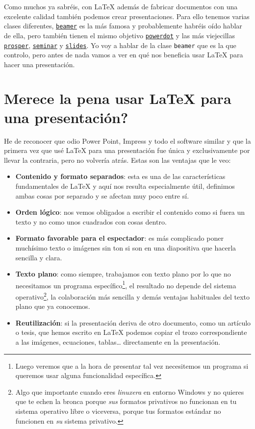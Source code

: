 Como muchos ya sabréis, con LaTeX además de fabricar documentos con una
excelente calidad también podemos crear presentaciones. Para ello
tenemos varias clases diferentes,
\href{https://www.ctan.org/pkg/beamer}{\lstinline!beamer!} es la más
famosa y probablemente habréis oído hablar de ella, pero también tienen
el mismo objetivo
\href{http://www.ctan.org/pkg/powerdot/}{\lstinline!powerdot!} y las más
viejecillas \href{http://www.ctan.org/pkg/prosper}{\lstinline!prosper!},
\href{https://www.ctan.org/pkg/seminar}{\lstinline!seminar!} y
\href{http://www.ctan.org/pkg/slides}{\lstinline!slides!}. Yo voy a
hablar de la clase \lstinline!beamer! que es la que controlo, pero antes
de nada vamos a ver en qué nos beneficia usar LaTeX para hacer una
presentación.

\section{Merece la pena usar LaTeX para una
presentación?}

He de reconocer que odio Power Point, Impress y todo el software similar
y que la primera vez que usé LaTeX para una presentación fue única y
exclusivamente por llevar la contraria, pero no volvería atrás. Estas
son las ventajas que le veo:

\begin{itemize}
\item
  \textbf{Contenido y formato separados}: esta es una de las
  características fundamentales de LaTeX y aquí nos resulta
  especialmente útil, definimos ambas cosas por separado y se afectan
  muy poco entre sí.
\item
  \textbf{Orden lógico}: nos vemos obligados a escribir el contenido
  como si fuera un texto y no como unos cuadrados con cosas dentro.
\item
  \textbf{Formato favorable para el espectador}: es más complicado poner
  muchísimo texto o imágenes sin ton si son en una diapositiva que
  hacerla sencilla y clara.
\item
  \textbf{Texto plano}: como siempre, trabajamos con texto plano por lo
  que no necesitamos un programa específico\footnote{Luego veremos que a
    la hora de presentar tal vez necesitemos un programa si queremos
    usar alguna funcionalidad específica.}, el resultado no depende del
  sistema operativo\footnote{Algo que importante cuando eres
    \emph{linuxera} en entorno Windows y no quieres que te echen la
    bronca porque \emph{sus} formatos privativos no funcionan en tu
    sistema operativo libre o viceversa, porque tus formatos estándar no
    funcionen en \emph{su} sistema privativo.}, la colaboración más
  sencilla y demás ventajas habituales del texto plano que ya conocemos.
\item
  \textbf{Reutilización}: si la presentación deriva de otro documento,
  como un artículo o tesis, que hemos escrito en LaTeX podemos copiar el
  trozo correspondiente a las imágenes, ecuaciones, tablas\ldots{}
  directamente en la presentación.
\end{itemize}

